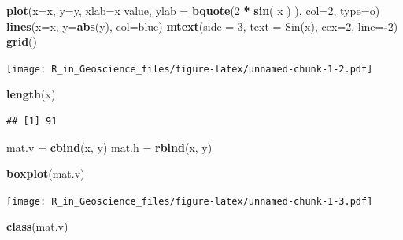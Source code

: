 \documentclass[]{scrbook}
\newenvironment{Shaded}{\begin{snugshade}}{\end{snugshade}}
\newcommand{\DataTypeTok}[1]{\textcolor[rgb]{0.13,0.29,0.53}{#1}}
\newcommand{\DecValTok}[1]{\textcolor[rgb]{0.00,0.00,0.81}{#1}}
\newcommand{\KeywordTok}[1]{\textcolor[rgb]{0.13,0.29,0.53}{\textbf{#1}}}
\newcommand{\NormalTok}[1]{#1}
\newcommand{\OperatorTok}[1]{\textcolor[rgb]{0.81,0.36,0.00}{\textbf{#1}}}
\newcommand{\StringTok}[1]{\textcolor[rgb]{0.31,0.60,0.02}{#1}}
\begin{document}
\begin{Shaded}
\begin{Highlighting}[]
\KeywordTok{plot}\NormalTok{(}\DataTypeTok{x=}\NormalTok{x, }\DataTypeTok{y=}\NormalTok{y, }
     \DataTypeTok{xlab=}\StringTok{\textquotesingle{}x value\textquotesingle{}}\NormalTok{, }\DataTypeTok{ylab =} \KeywordTok{bquote}\NormalTok{(}\DecValTok{2} \OperatorTok{*}\StringTok{ }\KeywordTok{sin}\NormalTok{( x ) ), }\DataTypeTok{col=}\DecValTok{2}\NormalTok{,}
     \DataTypeTok{type=}\StringTok{\textquotesingle{}o\textquotesingle{}}\NormalTok{)}
\KeywordTok{lines}\NormalTok{(}\DataTypeTok{x=}\NormalTok{x, }\DataTypeTok{y=}\KeywordTok{abs}\NormalTok{(y), }\DataTypeTok{col=}\StringTok{\textquotesingle{}blue\textquotesingle{}}\NormalTok{)}
\KeywordTok{mtext}\NormalTok{(}\DataTypeTok{side =} \DecValTok{3}\NormalTok{, }\DataTypeTok{text =} \StringTok{\textquotesingle{}Sin(x)\textquotesingle{}}\NormalTok{, }\DataTypeTok{cex=}\DecValTok{2}\NormalTok{, }\DataTypeTok{line=}\OperatorTok{{-}}\DecValTok{2}\NormalTok{)}
\KeywordTok{grid}\NormalTok{()}
\end{Highlighting}
\end{Shaded}

\texttt{[image: R\_in\_Geoscience\_files/figure-latex/unnamed-chunk-1-2.pdf]}

\begin{Shaded}
\begin{Highlighting}[]
\KeywordTok{length}\NormalTok{(x)}
\end{Highlighting}
\end{Shaded}

\begin{verbatim}
## [1] 91
\end{verbatim}

\begin{Shaded}
\begin{Highlighting}[]
\NormalTok{mat.v =}\StringTok{ }\KeywordTok{cbind}\NormalTok{(x, y)}
\NormalTok{mat.h =}\StringTok{ }\KeywordTok{rbind}\NormalTok{(x, y)}

\KeywordTok{boxplot}\NormalTok{(mat.v)}
\end{Highlighting}
\end{Shaded}

\texttt{[image: R\_in\_Geoscience\_files/figure-latex/unnamed-chunk-1-3.pdf]}

\begin{Shaded}
\begin{Highlighting}[]
\KeywordTok{class}\NormalTok{(mat.v)}
\end{Highlighting}
\end{Shaded}
\end{document}
